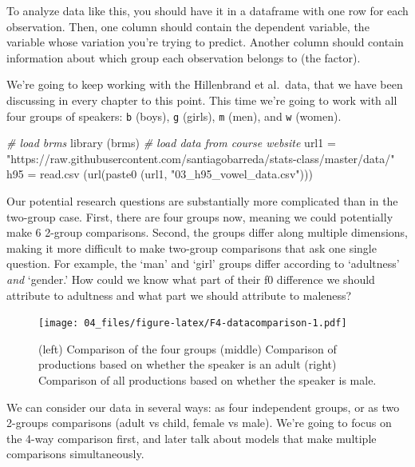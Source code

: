 \documentclass[
]{book}
\newenvironment{Shaded}{\begin{snugshade}}{\end{snugshade}}
\newcommand{\CommentTok}[1]{\textcolor[rgb]{0.56,0.35,0.01}{\textit{#1}}}
\newcommand{\FunctionTok}[1]{\textcolor[rgb]{0.00,0.00,0.00}{#1}}
\newcommand{\NormalTok}[1]{#1}
\newcommand{\OtherTok}[1]{\textcolor[rgb]{0.56,0.35,0.01}{#1}}
\newcommand{\StringTok}[1]{\textcolor[rgb]{0.31,0.60,0.02}{#1}}
\begin{document}
To analyze data like this, you should have it in a dataframe with one row for each observation. Then, one column should contain the dependent variable, the variable whose variation you're trying to predict. Another column should contain information about which group each observation belongs to (the factor).

We're going to keep working with the Hillenbrand et al.~data, that we have been discussing in every chapter to this point. This time we're going to work with all four groups of speakers: \texttt{b} (boys), \texttt{g} (girls), \texttt{m} (men), and \texttt{w} (women).

\begin{Shaded}
\begin{Highlighting}[]
\CommentTok{\# load brms}
\FunctionTok{library}\NormalTok{ (brms)}
\CommentTok{\# load data from course website}
\NormalTok{url1 }\OtherTok{=} \StringTok{"https://raw.githubusercontent.com/santiagobarreda/stats{-}class/master/data/"}
\NormalTok{h95 }\OtherTok{=} \FunctionTok{read.csv}\NormalTok{ (}\FunctionTok{url}\NormalTok{(}\FunctionTok{paste0}\NormalTok{ (url1, }\StringTok{"03\_h95\_vowel\_data.csv"}\NormalTok{)))}
\end{Highlighting}
\end{Shaded}

Our potential research questions are substantially more complicated than in the two-group case. First, there are four groups now, meaning we could potentially make 6 2-group comparisons. Second, the groups differ along multiple dimensions, making it more difficult to make two-group comparisons that ask one single question. For example, the `man' and `girl' groups differ according to `adultness' \emph{and} `gender.' How could we know what part of their f0 difference we should attribute to adultness and what part we should attribute to maleness?

\begin{figure}
\centering
\texttt{[image: 04\_files/figure-latex/F4-datacomparison-1.pdf]}
\caption{\label{fig:F4-datacomparison}(left) Comparison of the four groups (middle) Comparison of productions based on whether the speaker is an adult (right) Comparison of all productions based on whether the speaker is male.}
\end{figure}

We can consider our data in several ways: as four independent groups, or as two 2-groups comparisons (adult vs child, female vs male). We're going to focus on the 4-way comparison first, and later talk about models that make multiple comparisons simultaneously.
\end{document}

